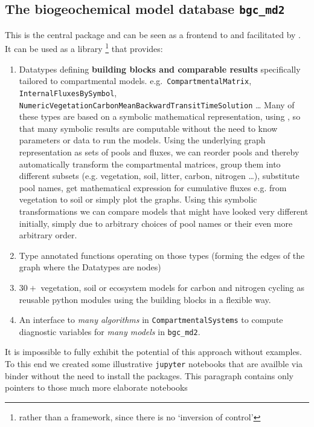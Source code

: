 \subsection{The biogeochemical model database \texttt{bgc\_md2}}
This is the central package and can be seen as a frontend to \CompartmentalSystems and \LAPM facilitated by \ComputabilityGraphs.
It can be used as a library \footnote{rather than a framework, since there is no `inversion of control'} 
that provides: 
  \begin{enumerate}
    \item
      Datatypes defining {\bf building blocks and comparable results} 
      specifically tailored to compartmental models.
      e.g.\ \texttt{CompartmentalMatrix}, \texttt{InternalFluxesBySymbol},
      \texttt{NumericVegetationCarbonMeanBackwardTransitTimeSolution} \dots  
      Many of these types are based on a symbolic
      mathematical representation, using \sympy, so that many symbolic results are computable 
      without the need to know parameters or data to  run the models.
      Using the underlying graph representation as sets of pools and fluxes, we can reorder pools and thereby automatically transform the compartmental matrices, group them into different subsets (e.g. vegetation, soil, litter, carbon, nitrogen \dots ), substitute pool names, get mathematical expression for cumulative fluxes e.g. from vegetation to soil or simply plot the graphs.
      Using this symbolic transformations we can compare models that might have looked very different initially, simply due to arbitrary choices of pool names or their even more arbitrary order. 
    \item
      Type annotated functions operating on those types (forming the edges of the graph where the Datatypes are nodes) 
    \item
    $30+$ vegetation, soil or ecosystem models for carbon and nitrogen cycling
      as reusable python modules using the building blocks in a flexible way. 
    \item 
      An interface to \emph{many  algorithms} in \texttt{CompartmentalSystems} to compute diagnostic variables
      for \emph{many models} in \texttt{bgc\_md2}.
  \end{enumerate}
It is impossible to fully exhibit the potential of this approach without
examples.
To this end we created some illustrative \texttt{jupyter} notebooks that are
availble via binder without the need to install the packages. 
This paragraph contains only pointers to those much more elaborate notebooks
